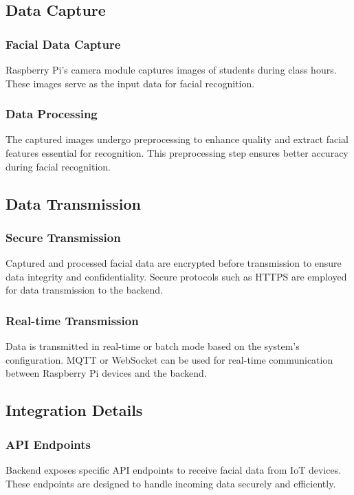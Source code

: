 \documentclass[conference]{IEEEtran}
\begin{document}
\subsection{Data Capture}
\subsubsection{Facial Data Capture}
Raspberry Pi's camera module captures images of students during class hours. These images serve as the input data for facial recognition.

\subsubsection{Data Processing}
The captured images undergo preprocessing to enhance quality and extract facial features essential for recognition. This preprocessing step ensures better accuracy during facial recognition.

\subsection{Data Transmission}
\subsubsection{Secure Transmission}
Captured and processed facial data are encrypted before transmission to ensure data integrity and confidentiality. Secure protocols such as HTTPS are employed for data transmission to the backend.

\subsubsection{Real-time Transmission}
Data is transmitted in real-time or batch mode based on the system's configuration. MQTT or WebSocket can be used for real-time communication between Raspberry Pi devices and the backend.

\subsection{Integration Details}
\subsubsection{API Endpoints}
Backend exposes specific API endpoints to receive facial data from IoT devices. These endpoints are designed to handle incoming data securely and efficiently.
\end{document}
